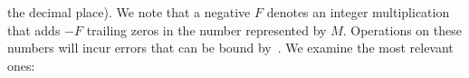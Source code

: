 \documentclass[sigconf]{llncs}
\begin{document}
the decimal place).  We note that a negative $F$ denotes an integer
multiplication that adds $-F$ trailing zeros in the number represented by
$M$.
Operations on these numbers will incur errors that can be bound
by~\cite{DBLP:conf/arith/BrainTRW15}.  We examine the most relevant ones:
%
\end{document}
